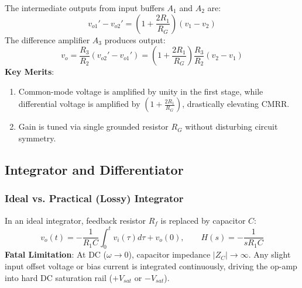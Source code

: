\documentclass[12pt,a4paper]{article}
\begin{document}
\begin{tcolorbox}[formulabox, title={Instrumentation Amplifier Transfer Characteristic}]
The intermediate outputs from input buffers $A_1$ and $A_2$ are:
\begin{equation}
  v_{o1}' - v_{o2}' = \left(1 + \frac{2 R_1}{R_G}\right)(v_1 - v_2)
\end{equation}
The difference amplifier $A_3$ produces output:
\begin{equation}
  v_o = \frac{R_3}{R_2}(v_{o2}' - v_{o1}') = \left(1 + \frac{2 R_1}{R_G}\right)\frac{R_3}{R_2}(v_2 - v_1)
\end{equation}
\textbf{Key Merits}:
\begin{enumerate}[leftmargin=14pt, itemsep=2pt, topsep=2pt]
  \item Common-mode voltage is amplified by unity in the first stage, while differential voltage is amplified by $\left(1 + \frac{2R_1}{R_G}\right)$, drastically elevating CMRR.
  \item Gain is tuned via single grounded resistor $R_G$ without disturbing circuit symmetry.
\end{enumerate}
\end{tcolorbox}

\subsection{Integrator and Differentiator}

\subsubsection{Ideal vs. Practical (Lossy) Integrator}
In an ideal integrator, feedback resistor $R_f$ is replaced by capacitor $C$:
\begin{equation}
  v_o(t) = -\frac{1}{R_1 C} \int_0^t v_i(\tau)d\tau + v_o(0), \qquad H(s) = -\frac{1}{s R_1 C}
\end{equation}
\textbf{Fatal Limitation}: At DC ($\omega \to 0$), capacitor impedance $|Z_C| \to \infty$. Any slight input offset voltage or bias current is integrated continuously, driving the op-amp into hard DC saturation rail ($+V_{sat}$ or $-V_{sat}$).
\end{document}
